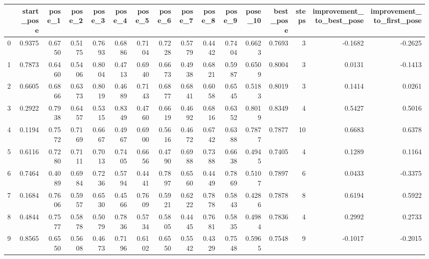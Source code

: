 \begin{tabular}{lrrrrrrrrrrrrrrr}
\toprule
{} &  start\_pose &  pose\_1 &  pose\_2 &  pose\_3 &  pose\_4 &  pose\_5 &  pose\_6 &  pose\_7 &  pose\_8 &  pose\_9 &  pose\_10 &  best\_pose &  steps &  improvement\_to\_best\_pose &  improvement\_to\_first\_pose \\
\midrule
0   &      0.9375 &  0.6750 &  0.5175 &  0.7693 &  0.6886 &  0.7104 &  0.7228 &  0.5779 &  0.4442 &  0.7404 &   0.6623 &     0.7693 &      3 &                   -0.1682 &                    -0.2625 \\
1   &      0.7873 &  0.6460 &  0.5406 &  0.8004 &  0.4713 &  0.6940 &  0.6673 &  0.4938 &  0.6821 &  0.5987 &   0.6509 &     0.8004 &      3 &                    0.0131 &                    -0.1413 \\
2   &      0.6605 &  0.6866 &  0.6373 &  0.8019 &  0.4689 &  0.7143 &  0.6877 &  0.6841 &  0.6058 &  0.6545 &   0.5183 &     0.8019 &      3 &                    0.1414 &                     0.0261 \\
3   &      0.2922 &  0.7938 &  0.6457 &  0.5315 &  0.8349 &  0.4760 &  0.6619 &  0.4692 &  0.6816 &  0.6352 &   0.8019 &     0.8349 &      4 &                    0.5427 &                     0.5016 \\
4   &      0.1194 &  0.7572 &  0.7169 &  0.6667 &  0.4967 &  0.6900 &  0.5616 &  0.4672 &  0.6742 &  0.6388 &   0.7877 &     0.7877 &     10 &                    0.6683 &                     0.6378 \\
5   &      0.6116 &  0.7280 &  0.7111 &  0.7013 &  0.7405 &  0.6656 &  0.4790 &  0.6988 &  0.7388 &  0.6638 &   0.4945 &     0.7405 &      4 &                    0.1289 &                     0.1164 \\
6   &      0.7464 &  0.4089 &  0.6984 &  0.7236 &  0.5794 &  0.4441 &  0.7897 &  0.6560 &  0.4449 &  0.7869 &   0.5107 &     0.7897 &      6 &                    0.0433 &                    -0.3375 \\
7   &      0.1684 &  0.7606 &  0.5957 &  0.6530 &  0.4566 &  0.7609 &  0.5921 &  0.6222 &  0.7878 &  0.5843 &   0.4286 &     0.7878 &      8 &                    0.6194 &                     0.5922 \\
8   &      0.4844 &  0.7577 &  0.5878 &  0.5079 &  0.7836 &  0.5734 &  0.5805 &  0.4445 &  0.7681 &  0.5835 &   0.4984 &     0.7836 &      4 &                    0.2992 &                     0.2733 \\
9   &      0.8565 &  0.6550 &  0.5608 &  0.4673 &  0.7196 &  0.6102 &  0.6550 &  0.5542 &  0.4329 &  0.7548 &   0.5965 &     0.7548 &      9 &                   -0.1017 &                    -0.2015 \\

\end{tabular}

